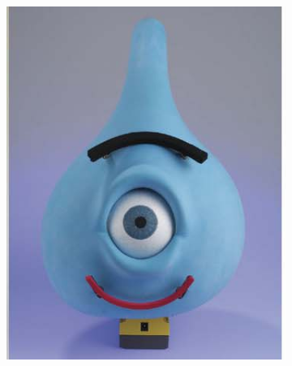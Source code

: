 \documentclass[a4paper,twoside]{book}
\begin{document}
\begin{figure}[h]
  \centering
  \begin{subfigure}[b]{0.3\textwidth}
    \includegraphics[width=1\linewidth]{img/Bartneck} 
  \end{subfigure}%
  \quad%
  \begin{subfigure}[b]{0.3\textwidth}

\end{subfigure}
\end{figure}
\end{document}
